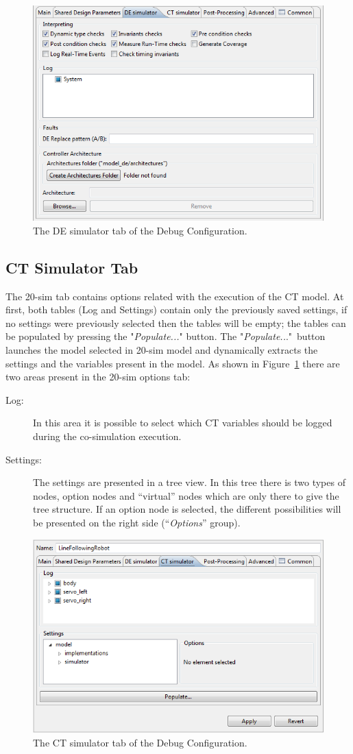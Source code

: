 \documentclass{crescendorepchap}
\begin{document}
\begin{figure}[htbp]
\centering
\includegraphics[width=.6\textwidth]{images/DestecsDebugConfigurationDESimulator.png}
\caption{The DE simulator tab of the Debug Configuration.}
\end{figure}

\subsection{CT Simulator Tab}

The 20-sim tab contains options related with the execution of
the CT model. At first, both tables (Log and Settings) contain only the
previously saved settings, if no settings were previously selected then
the tables will be empty; the tables can be populated by pressing the
"\emph{Populate...}" button. The "\emph{Populate..}."~button launches
the model selected in 20-sim model and dynamically extracts the settings
and the variables present in the model. As shown in Figure~\ref{fig:CTSimInDebug}
there are two areas present in the 20-sim options tab:

\begin{description}
\item[Log:] In this area it is possible to select which CT variables
  should be logged during the co-simulation execution.
\item[Settings:] The settings are presented in a tree view. In this tree
  there is two types of nodes, option nodes and ``virtual'' nodes which
  are only there to give the tree structure. If an option node is
  selected, the different possibilities will be presented on the right
  side (``\emph{Options}'' group).
\end{description}

\begin{figure}[htbp]
\centering
\includegraphics[width=.6\textwidth]{images/DestecsDebugConfigurationCTSimulator.png}
\caption{The CT simulator tab of the Debug Configuration.\label{fig:CTSimInDebug}}
\end{figure}
\end{document}
